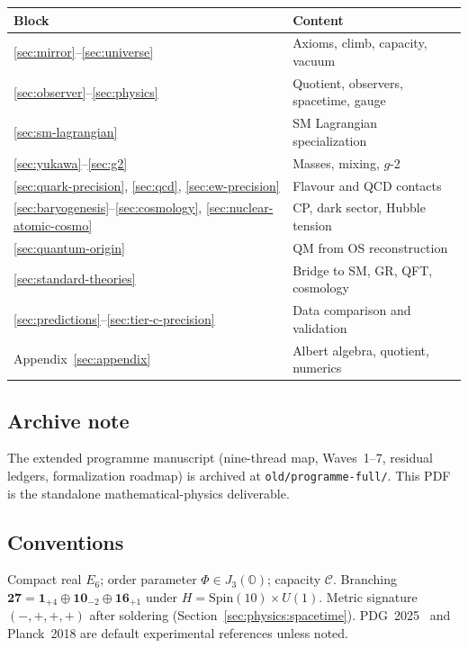 \documentclass[11pt]{article}
\theoremstyle{plain}
\theoremstyle{definition}
\theoremstyle{remark}
\numberwithin{equation}{section}
\newcommand{\jalg}{J_3(\mathbb{O})}
\newcommand{\Spin}{\mathrm{Spin}}
\newcommand{\capacity}{\mathcal{C}}
\newcommand{\orderparam}{\Phi}
\begin{document}
\begin{center}
\small
\renewcommand{\arraystretch}{1.12}
\begin{tabular}{@{}ll@{}}
\toprule
\textbf{Block} & \textbf{Content} \\
\midrule
\ref{sec:mirror}--\ref{sec:universe} &
  Axioms, climb, capacity, vacuum \\
\ref{sec:observer}--\ref{sec:physics} &
  Quotient, observers, spacetime, gauge \\
\ref{sec:sm-lagrangian} &
  SM Lagrangian specialization \\
\ref{sec:yukawa}--\ref{sec:g2} &
  Masses, mixing, $g$-2 \\
\ref{sec:quark-precision}, \ref{sec:qcd}, \ref{sec:ew-precision} &
  Flavour and QCD contacts \\
\ref{sec:baryogenesis}--\ref{sec:cosmology}, \ref{sec:nuclear-atomic-cosmo} &
  CP, dark sector, Hubble tension \\
\ref{sec:quantum-origin} &
  QM from OS reconstruction \\
\ref{sec:standard-theories} &
  Bridge to SM, GR, QFT, cosmology \\
\ref{sec:predictions}--\ref{sec:tier-c-precision} &
  Data comparison and validation \\
Appendix~\ref{sec:appendix} &
  Albert algebra, quotient, numerics \\
\bottomrule
\end{tabular}
\end{center}

\subsection{Archive note}

The extended programme manuscript (nine-thread map, Waves~1--7, residual
ledgers, formalization roadmap) is archived at
\texttt{old/programme-full/}. This PDF is the standalone mathematical-physics
deliverable.

\subsection{Conventions}

Compact real $E_6$; order parameter $\orderparam\in\jalg$; capacity
$\capacity$. Branching
$\mathbf{27}=\mathbf{1}_{+4}\oplus\mathbf{10}_{-2}\oplus\mathbf{16}_{+1}$
under $H=\Spin(10)\times U(1)$. Metric signature $(-,+,+,+)$ after soldering
(Section~\ref{sec:physics:spacetime}). PDG~2025~\cite{PDG2025} and Planck~2018
are default experimental references unless noted.%
\end{document}
